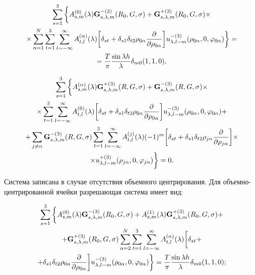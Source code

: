 \begin{russian}
\begin{multline}
\sum\limits_{s = 1}^3 \bigg\{  A_{s,m}^{(0)}(\lambda ){\bf{G}}_{s,\lambda ,m}^{ - (3)}({R_0},G,\sigma ) + {\bf{G}}_{s,\lambda ,m}^{ + (3)}({R_0},G,\sigma ) \times \\
\times \sum\limits_{\alpha  = 1}^N {\sum\limits_{t = 1}^3 {\sum\limits_{l =  - \infty }^\infty  {A_{t,l}^{(\alpha )}} } } (\lambda )\bigg[{\delta _{st}} + {\delta _{s1}}{\delta _{t2}}{\rho _{0\alpha }}\frac{\partial }{{\partial {\rho _{0\alpha }}}}\bigg]u_{\lambda ,l - m}^{ - (3)}({\rho _{0\alpha }},0,{\varphi _{0\alpha }})\bigg\}  = \\
= \frac{T}{\pi }\frac{{\sin \lambda h}}{\lambda }{\delta _{m0}}(1,1,0),
\label{eq:7:20}
\end{multline}

\begin{multline}
\sum\limits_{s = 1}^3 \bigg\{  A_{s,m}^{(\alpha )}(\lambda ){\bf{G}}_{s,\lambda ,m}^{ + (3)}(R,G,\sigma ) + {\bf{G}}_{s,\lambda ,m}^{ - (3)}(R,G,\sigma ) \times \\
\times \sum\limits_{t = 1}^3 {\sum\limits_{l =  - \infty }^\infty  {A_{t,l}^{(0)}} } (\lambda )\bigg[{\delta _{st}} + {\delta _{s1}}{\delta _{t2}}{\rho _{0\alpha }}\frac{\partial }{{\partial {\rho _{0\alpha }}}}\bigg]u_{\lambda ,l - m}^{ - (3)}({\rho _{0\alpha }},0,{\varphi _{0\alpha }}) + \\
+ \sum\limits_{j \ne \alpha } {{\bf{G}}_{s,\lambda ,m}^{ - (3)}} (R,G,\sigma )\sum\limits_{t = 1}^3 {\sum\limits_{l =  - \infty }^\infty  {A_{t,l}^{(j)}} } (\lambda ){( - 1)^m}\bigg[{\delta _{st}} + {\delta _{s1}}{\delta _{t2}}{\rho _{j\alpha }}\frac{\partial }{{\partial {\rho _{j\alpha }}}}\bigg] \times \\
\times u_{\lambda ,l - m}^{ + (3)}({\rho _{j\alpha }},0,{\varphi _{j\alpha }})\bigg\}  = 0.
\label{eq:7:21}
\end{multline}

Система записана в случае отсутствия объемного центрирования. Для объем\-но-цент\-ри\-ро\-ван\-ной ячейки разрешающая система имеет вид:

\begin{multline}
\sum\limits_{s = 1}^3 \bigg\{  A_{s,m}^{(0)}(\lambda ){\bf{G}}_{s,\lambda ,m}^{ - (3)}({R_0},G,\sigma ) + A_{s,m}^{(1)}(\lambda ){\bf{G}}_{s,\lambda ,m}^{ + (3)}({R_0},G,\sigma ) + \\
+ {\bf{G}}_{s,\lambda ,m}^{ + (3)}({R_0},G,\sigma )\sum\limits_{\alpha  = 2}^N {\sum\limits_{t = 1}^3 {\sum\limits_{l =  - \infty }^\infty  {A_{t,l}^{(\alpha )}} } } (\lambda )\bigg[{\delta _{st}} + \\
+ {\delta _{s1}}{\delta _{t2}}{\rho _{0\alpha }}\frac{\partial }{{\partial {\rho _{0\alpha }}}}\bigg]u_{\lambda ,l - m}^{ - (3)}({\rho _{0\alpha }},0,{\varphi _{0\alpha }})\bigg\}  = \frac{T}{\pi }\frac{{\sin \lambda h}}{\lambda }{\delta _{m0}}(1,1,0);
\label{eq:7:22}
\end{multline}


\end{russian}
